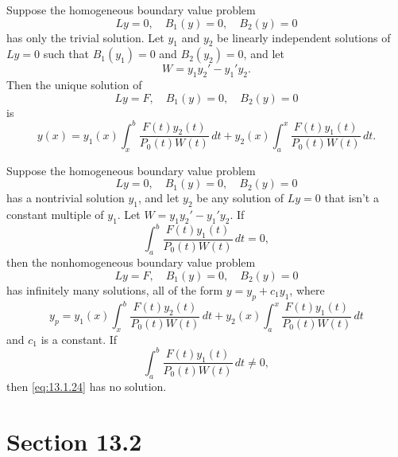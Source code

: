 \setcounter{theorem}{2}
\setcounter{equation}{14}
\begin{theorem}
  \label{thmtype:13.1.3} Suppose the homogeneous boundary value problem
  \begin{equation}
    \label{eq:13.1.15}Ly=0,\quad B_{1}(y)=0,\quad B_{2}(y)=0
  \end{equation}
  has only the trivial solution. Let $y_{1}$ and $y_{2}$ be linearly independent solutions of $Ly=0$
  such that $B_{1}(y_{1})=0$ and $B_{2}(y_{2})=0$, and let
  \[
    W=y_{1}y_{2}'-y_{1}'y_{2}.
  \]
  Then the unique solution of
  \begin{equation}
    \label{eq:13.1.16}Ly=F,\quad B_{1}(y)=0,\quad B_{2}(y)=0
  \end{equation}
  is
  \begin{equation}
    \label{eq:13.1.17}y(x)=y_{1}(x)\int_{x}^{b}\frac{F(t)y_{2}(t)}{P_{0}(t)W(t)}\,dt+ y_{2}(x)\int_{a}^{x}\frac{F(t)y_{1}(t)}{P_{0}(t)W(t)}\,dt.
  \end{equation}
\end{theorem}

\setcounter{theorem}{3}
\setcounter{equation}{21}
\begin{theorem}
  \label{thmtype:13.1.4} Suppose the homogeneous boundary value problem
  \begin{equation}
    \label{eq:13.1.22}Ly=0,\quad B_{1}(y)=0,\quad B_{2}(y)=0
  \end{equation}
  has a nontrivial solution $y_{1}$, and let $y_{2}$ be any solution of $Ly=0$ that isn't a constant
  multiple of $y_{1}$. Let $W=y_{1}y_{2}'-y_{1}'y_{2}$. If
  \begin{equation}
    \label{eq:13.1.23}\int_{a}^{b}\frac{F(t)y_{1}(t)}{P_{0}(t)W(t)}\,dt=0,
  \end{equation}
  then the nonhomogeneous boundary value problem
  \begin{equation}
    \label{eq:13.1.24}Ly=F,\quad B_{1}(y)=0,\quad B_{2}(y)=0
  \end{equation}
  has infinitely many solutions, all of the form $y=y_{p}+c_{1}y_{1}$, where
  \[
    y_{p}=y_{1}(x) \int_{x}^{b}\frac{F(t)y_{2}(t)}{P_{0}(t)W(t)}\,dt+ y_{2}(x) \int_{a}^{x}\frac{F(t)y_{1}(t)}{P_{0}(t)W(t)}\,dt
  \]
  and $c_{1}$ is a constant. If
  \[
    \int_{a}^{b}\frac{F(t)y_{1}(t)}{P_{0}(t)W(t)}\,dt\ne0,
  \]
  then \eqref{eq:13.1.24} has no solution.
\end{theorem}

\section*{Section 13.2}
\setcounter{chapter}{13}
\setcounter{section}{2}

